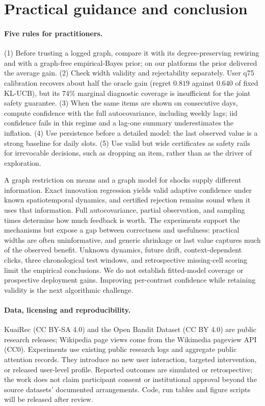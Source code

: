 \documentclass[sigconf,review,anonymous]{acmart}
\begin{document}
\section{Practical guidance and conclusion}\label{sec:conclusion}

\paragraph{Five rules for practitioners.} (1) Before trusting a logged graph, compare it with its degree-preserving rewiring and with a graph-free empirical-Bayes prior; on our platforms the prior delivered the average gain. (2) Check width validity and rejectability separately. User q75 calibration recovers about half the oracle gain (regret $0.819$ against $0.640$ of fixed KL-UCB), but its 74\% marginal diagnostic coverage is insufficient for the joint safety guarantee. (3) When the same items are shown on consecutive days, compute confidence with the full autocovariance, including weekly lags; iid confidence fails in this regime and a lag-one summary underestimates the inflation. (4) Use persistence before a detailed model: the last observed value is a strong baseline for daily slots. (5) Use valid but wide certificates as safety rails for irrevocable decisions, such as dropping an item, rather than as the driver of exploration.

A graph restriction on means and a graph model for shocks supply different information. Exact innovation regression yields valid adaptive confidence under known spatiotemporal dynamics, and certified rejection remains sound when it uses that information. Full autocovariance, partial observation, and sampling times determine how much feedback is worth. The experiments support the mechanisms but expose a gap between correctness and usefulness: practical widths are often uninformative, and generic shrinkage or last value captures much of the observed benefit. Unknown dynamics, future drift, context-dependent clicks, three chronological test windows, and retrospective missing-cell scoring limit the empirical conclusions. We do not establish fitted-model coverage or prospective deployment gains. Improving per-contrast confidence while retaining validity is the next algorithmic challenge.

\paragraph{Data, licensing and reproducibility.} KuaiRec (CC BY-SA 4.0) and the Open Bandit Dataset (CC BY 4.0) are public research releases; Wikipedia page views come from the Wikimedia pageview API (CC0). Experiments use existing public research logs and aggregate public attention records. They introduce no new user interaction, targeted intervention, or released user-level profile. Reported outcomes are simulated or retrospective; the work does not claim participant consent or institutional approval beyond the source datasets' documented arrangements. Code, run tables and figure scripts will be released after review.
\end{document}
